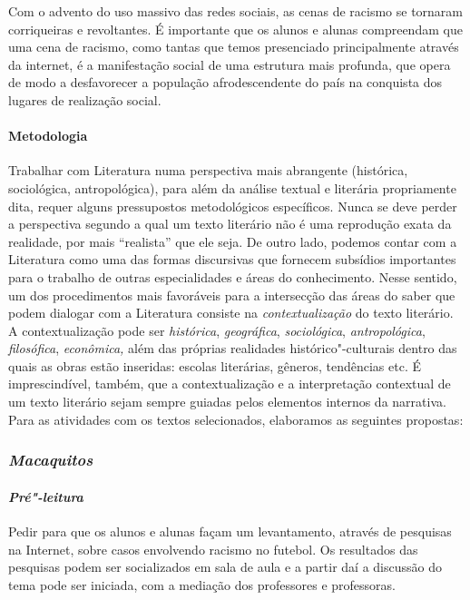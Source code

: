 \documentclass[11pt]{extarticle}
\begin{document}
{{Com o advento do uso massivo das redes sociais, as cenas de racismo se
tornaram corriqueiras e revoltantes. É importante que os alunos e alunas
compreendam que uma cena de racismo, como tantas que temos presenciado
principalmente através da internet, é a manifestação social de uma
estrutura mais profunda, que opera de modo a desfavorecer a população
afrodescendente do país na conquista dos lugares de realização social.

\paragraph{Metodologia} Trabalhar com Literatura numa perspectiva mais
abrangente (histórica, sociológica, antropológica), para além da análise
textual e literária propriamente dita, requer alguns pressupostos
metodológicos específicos. Nunca se deve perder a perspectiva segundo a
qual um texto literário não é uma reprodução exata da realidade, por
mais ``realista'' que ele seja. De outro lado, podemos contar com a
Literatura como uma das formas discursivas que fornecem subsídios
importantes para o trabalho de outras especialidades e áreas do
conhecimento. Nesse sentido, um dos procedimentos mais favoráveis para a
intersecção das áreas do saber que podem dialogar com a Literatura
consiste na \emph{contextualização} do texto literário. A
contextualização pode ser \emph{histórica}, \emph{geográfica},
\emph{sociológica}, \emph{antropológica}, \emph{filosófica},
\emph{econômica,} além das próprias realidades histórico"-culturais
dentro das quais as obras estão inseridas: escolas literárias, gêneros,
tendências etc. É imprescindível, também, que a contextualização e a
interpretação contextual de um texto literário sejam sempre guiadas
pelos elementos internos da narrativa. Para as atividades com os textos
selecionados, elaboramos as seguintes propostas:

\subsubsection{\textit{Macaquitos}}

\paragraph{\textit{Pré"-leitura }}

Pedir para que os alunos e alunas façam um levantamento, através de
pesquisas na Internet, sobre casos envolvendo racismo no futebol. Os
resultados das pesquisas podem ser socializados em sala de aula e a
partir daí a discussão do tema pode ser iniciada, com a mediação dos
professores e professoras.


}}
\end{document}
